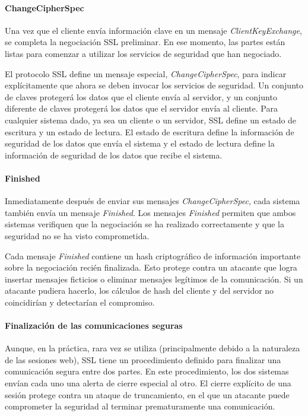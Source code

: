 \paragraph*{ChangeCipherSpec}
Una vez que el cliente envía información clave en un mensaje 
\emph{ClientKeyExchange}, se completa la negociación SSL preliminar. En ese 
momento, las partes están listas para comenzar a utilizar los servicios 
de seguridad que han negociado.

El protocolo SSL define un mensaje especial, \emph{ChangeCipherSpec}, para 
indicar explícitamente que ahora se deben invocar los servicios de 
seguridad. Un conjunto de claves protegerá los datos que el cliente 
envía al servidor, y un conjunto diferente de claves protegerá los 
datos que el servidor envía al cliente. Para cualquier sistema dado, 
ya sea un cliente o un servidor, SSL define un estado de escritura y 
un estado de lectura. El estado de escritura define la información de 
seguridad de los datos que envía el sistema y el estado de lectura 
define la información de seguridad de los datos que recibe el sistema.

\paragraph*{Finished}
Inmediatamente después de enviar sus mensajes \emph{ChangeCipherSpec}, cada 
sistema también envía un mensaje \emph{Finished}. Los mensajes \emph{Finished}
permiten que ambos sistemas verifiquen que la negociación se ha realizado 
correctamente y que la seguridad no se ha visto comprometida.

Cada mensaje \emph{Finished} contiene un hash criptográfico de información 
importante sobre la negociación recién finalizada. Esto protege contra 
un atacante que logra insertar mensajes ficticios o eliminar mensajes 
legítimos de la comunicación. Si un atacante pudiera hacerlo, los 
cálculos de hash del cliente y del servidor no coincidirían y detectarían 
el compromiso.

\paragraph*{Finalización de las comunicaciones seguras}

Aunque, en la práctica, rara vez se utiliza (principalmente debido a la 
naturaleza de las sesiones web), SSL tiene un procedimiento definido para 
finalizar una comunicación segura entre dos partes. En este procedimiento, 
los dos sistemas envían cada uno una alerta de cierre especial al otro. 
El cierre explícito de una sesión protege contra un ataque de truncamiento,
en el que un atacante puede comprometer la seguridad al terminar 
prematuramente una comunicación.

